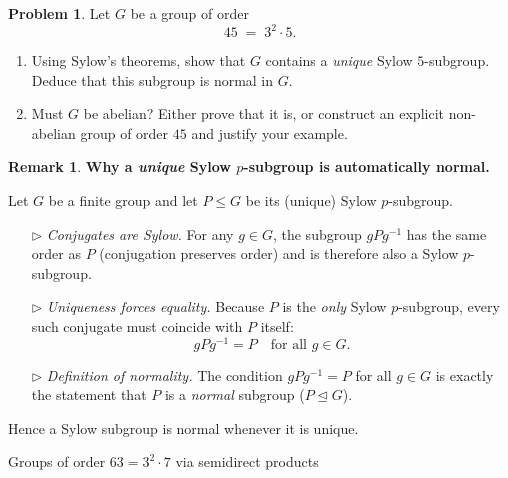 \documentclass[12pt]{article}
\theoremstyle{definition} %
\newtheorem{problem}{Problem}
\newtheorem{remark}{Remark}
\theoremstyle{plain} %
\begin{document}
  \begin{problem}
    Let \(G\) be a group of order
    \[
       45 \;=\; 3^{2}\cdot5.
    \]
    \begin{enumerate}[]
       \item
          Using Sylow’s theorems, show that \(G\) contains a \emph{unique}
          Sylow \(5\)-subgroup.  Deduce that this subgroup is normal in \(G\).
       \item
          Must \(G\) be abelian?  
          Either prove that it is, or construct an explicit non-abelian
          group of order \(45\) and justify your example.
    \end{enumerate}
    \end{problem}
    \begin{remark}
      \textbf{Why a \emph{unique} Sylow \(p\)-subgroup is automatically normal.}
      
      Let \(G\) be a finite group and let \(P\le G\) be its (unique) Sylow
      \(p\)-subgroup.
      \begin{enumerate}
         \item[\(\triangleright\)]
               \emph{Conjugates are Sylow.}  
               For any \(g\in G\), the subgroup
               \(gPg^{-1}\) has the same order as \(P\)
               (conjugation preserves order) and is therefore also a Sylow
               \(p\)-subgroup.
         \item[\(\triangleright\)]
               \emph{Uniqueness forces equality.}  
               Because \(P\) is the \emph{only} Sylow \(p\)-subgroup,
               every such conjugate must coincide with \(P\) itself:
               \[
                  gPg^{-1}=P
                  \quad\text{for all }g\in G.
               \]
         \item[\(\triangleright\)]
               \emph{Definition of normality.}  
               The condition \(gPg^{-1}=P\) for all \(g\in G\) is
               exactly the statement that \(P\) is a \emph{normal} subgroup
               (\(P\trianglelefteq G\)).
      \end{enumerate}
      Hence a Sylow subgroup is normal whenever it is unique.
      \end{remark}


\begin{center}
\large Groups of order \(63 = 3^{2}\cdot7\) via semidirect products
\end{center}
\end{document}
